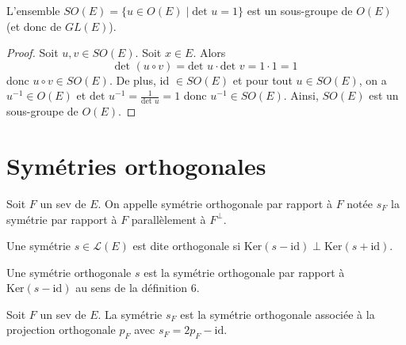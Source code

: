 \begin{proposition}
\label{prop:11}

L'ensemble $SO(E) = \{ u \in O(E) \mid \text{det } u = 1 \}$ est un sous-groupe de $O(E)$ (et donc de $GL(E)$).
\end{proposition}

\begin{proof}

Soit $u, v \in SO(E)$. Soit $x \in E$. Alors
\[
\text{det } (u \circ v) = \text{det } u \cdot \text{det } v = 1 \cdot 1 = 1
\]
donc $u \circ v \in SO(E)$. De plus, id $\in SO(E)$ et pour tout $u \in SO(E)$, on a $u^{-1} \in O(E)$ et $\text{det } u^{-1} = \frac{1}{\text{det } u} = 1$ donc $u^{-1} \in SO(E)$. Ainsi, $SO(E)$ est un sous-groupe de $O(E)$.


\end{proof}

\section{Symétries orthogonales}

\begin{definition}
\label{def:4}

Soit $F$ un sev de $E$. On appelle symétrie orthogonale par rapport à $F$ notée $s_F$ la symétrie par rapport à $F$ parallèlement à $F^\perp$.

\end{definition}

\begin{definition}
\label{def:5}

Une symétrie $s \in \mathcal{L}(E)$ est dite orthogonale si $\text{Ker}(s - \text{id}) \perp \text{Ker}(s + \text{id})$.

\end{definition}

\begin{remark}

Une symétrie orthogonale $s$ est la symétrie orthogonale par rapport à $\text{Ker}(s - \text{id})$ au sens de la définition 6.

\end{remark}

\begin{proposition}
\label{prop:12}

Soit $F$ un sev de $E$. La symétrie $s_F$ est la symétrie orthogonale associée à la projection orthogonale $p_F$ avec $s_F = 2p_F - \text{id}$.

\end{proposition}

